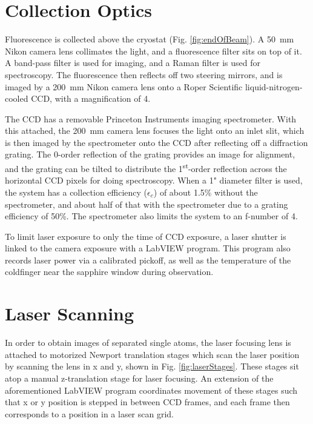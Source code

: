 

\section{Collection Optics}
\label{sec:collection}

Fluorescence is collected above the cryostat (Fig. \ref{fig:endOfBeam}).  A 50~mm Nikon camera lens collimates the light, and a fluorescence filter sits on top of it.  A band-pass filter is used for imaging, and a Raman filter is used for spectroscopy.  The fluorescence then reflects off two steering mirrors, and is imaged by a 200~mm Nikon camera lens onto a Roper Scientific liquid-nitrogen-cooled CCD, with a magnification of 4.

The CCD has a removable Princeton Instruments imaging spectrometer.  With this attached, the 200~mm camera lens focuses the light onto an inlet slit, which is then imaged by the spectrometer onto the CCD after reflecting off a diffraction grating.  The 0-order reflection of the grating provides an image for alignment, and the grating can be tilted to distribute the 1\textsuperscript{st}-order reflection across the horizontal CCD pixels for doing spectroscopy.  When a 1" diameter filter is used, the system has a collection efficiency ($\epsilon_{c}$) of about 1.5\% without the spectrometer, and about half of that with the spectrometer due to a grating efficiency of 50\%.  The spectrometer also limits the system to an f-number of 4.

To limit laser exposure to only the time of CCD exposure, a laser shutter is linked to the camera exposure with a LabVIEW program.  This program also records laser power via a calibrated pickoff, as well as the temperature of the coldfinger near the sapphire window during observation.

\section{Laser Scanning}
\label{sec:laserscanning}

In order to obtain images of separated single atoms, the laser focusing lens is attached to motorized Newport translation stages which scan the laser position by scanning the lens in x and y, shown in Fig. \ref{fig:laserStages}.  These stages sit atop a manual z-translation stage for laser focusing.  An extension of the aforementioned LabVIEW program coordinates movement of these stages such that x or y position is stepped in between CCD frames, and each frame then corresponds to a position in a laser scan grid.

